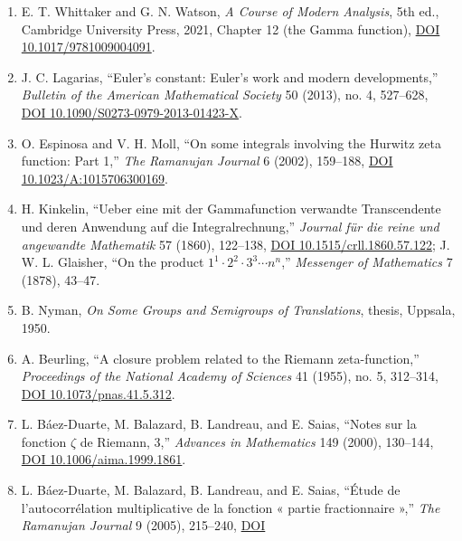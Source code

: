 \documentclass[
  11pt,
]{book}
\begin{document}
\begin{enumerate}
  L. J. Boya, ``Another relation between \(\pi\), \(e\), \(\gamma\) and
  \(\zeta(n)\),'' \emph{RACSAM} 102 (2008), no. 2, 199--202,
  \href{https://doi.org/10.1007/BF03191819}{DOI 10.1007/BF03191819}. The
  reciprocal-triangular series (GA.3), obtained from Stirling's formula.
\item
  E. T. Whittaker and G. N. Watson, \emph{A Course of Modern Analysis},
  5th ed., Cambridge University Press, 2021, Chapter 12 (the Gamma
  function), \href{https://doi.org/10.1017/9781009004091}{DOI
  10.1017/9781009004091}.
\item
  J. C. Lagarias, ``Euler's constant: Euler's work and modern
  developments,'' \emph{Bulletin of the American Mathematical Society}
  50 (2013), no. 4, 527--628,
  \href{https://doi.org/10.1090/S0273-0979-2013-01423-X}{DOI
  10.1090/S0273-0979-2013-01423-X}.
\item
  O. Espinosa and V. H. Moll, ``On some integrals involving the Hurwitz
  zeta function: Part 1,'' \emph{The Ramanujan Journal} 6 (2002),
  159--188, \href{https://doi.org/10.1023/A:1015706300169}{DOI
  10.1023/A:1015706300169}.
\item
  H. Kinkelin, ``Ueber eine mit der Gammafunction verwandte
  Transcendente und deren Anwendung auf die Integralrechnung,''
  \emph{Journal für die reine und angewandte Mathematik} 57 (1860),
  122--138, \href{https://doi.org/10.1515/crll.1860.57.122}{DOI
  10.1515/crll.1860.57.122}; J. W. L. Glaisher, ``On the product
  \(1^1\cdot2^2\cdot3^3\cdots n^n\),'' \emph{Messenger of Mathematics} 7
  (1878), 43--47.
\item
  B. Nyman, \emph{On Some Groups and Semigroups of Translations},
  thesis, Uppsala, 1950.
\item
  A. Beurling, ``A closure problem related to the Riemann
  zeta-function,'' \emph{Proceedings of the National Academy of
  Sciences} 41 (1955), no. 5, 312--314,
  \href{https://doi.org/10.1073/pnas.41.5.312}{DOI
  10.1073/pnas.41.5.312}.
\item
  L. Báez-Duarte, M. Balazard, B. Landreau, and E. Saias, ``Notes sur la
  fonction \(\zeta\) de Riemann, 3,'' \emph{Advances in Mathematics} 149
  (2000), 130--144, \href{https://doi.org/10.1006/aima.1999.1861}{DOI
  10.1006/aima.1999.1861}.
\item
  L. Báez-Duarte, M. Balazard, B. Landreau, and E. Saias, ``Étude de
  l'autocorrélation multiplicative de la fonction « partie fractionnaire
  »,'' \emph{The Ramanujan Journal} 9 (2005), 215--240,
  \href{https://doi.org/10.1007/s11139-005-0834-4}{DOI
}
\end{enumerate}
\end{document}
